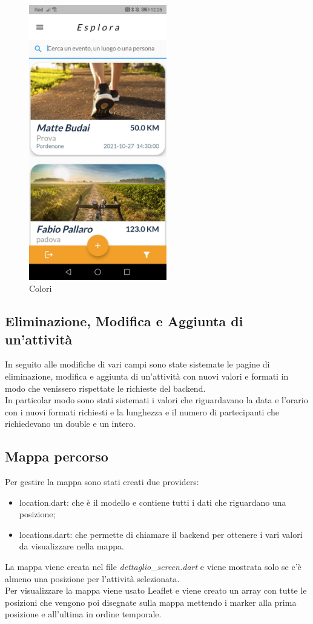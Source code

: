 \begin{figure}[htbp]	
	\centering
	\includegraphics[width=6cm]{immagini/colori.jpeg}
	\caption{Colori}
	\label{fig:Colori}
\end{figure}


\subsection{Eliminazione, Modifica e Aggiunta di un'attività}
In seguito alle modifiche di vari campi sono state sistemate le pagine di eliminazione, modifica e aggiunta di un'attività con nuovi valori e formati in modo che venissero rispettate le richieste del backend.\\
In particolar modo sono stati sistemati i valori che riguardavano la data e l'orario con i nuovi formati richiesti e la lunghezza e il numero di partecipanti che richiedevano un double e un intero.

\newpage

\subsection{Mappa percorso}
Per gestire la mappa sono stati creati due providers:
\begin{itemize}
	\item location.dart: che è il modello e contiene tutti i dati che riguardano una posizione;
	\item locations.dart: che permette di chiamare il backend per ottenere i vari valori da visualizzare nella mappa.
\end{itemize}
La mappa viene creata nel file \textit{dettaglio\_screen.dart} e viene mostrata solo se c'è almeno una posizione per l'attività selezionata.\\
Per visualizzare la mappa viene usato Leaflet e viene creato un array con tutte le posizioni che vengono poi disegnate sulla mappa mettendo i marker alla prima posizione e all'ultima in ordine temporale.\\

